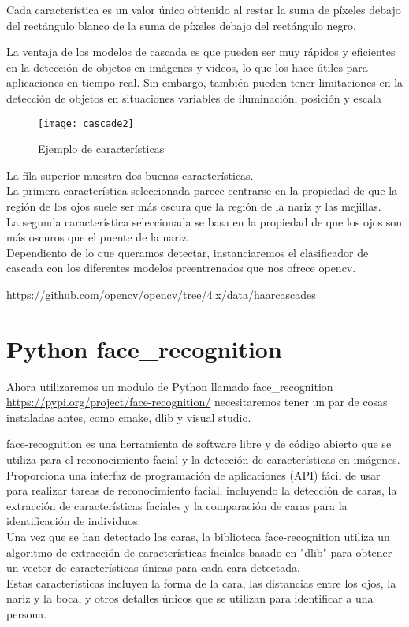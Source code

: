 Cada característica es un valor único obtenido al restar la suma de píxeles 
debajo del rectángulo blanco de la suma de píxeles debajo del rectángulo negro.

La ventaja de los modelos de cascada es que pueden ser muy rápidos y eficientes 
en la detección de objetos en imágenes y videos, lo que los hace útiles para 
aplicaciones en tiempo real. Sin embargo, también pueden tener limitaciones en 
la detección de objetos en situaciones variables de iluminación, posición y escala



\begin{figure}[H]
  \centering
  \texttt{[image: cascade2]}
  \caption{Ejemplo de características}\label{fig:ejemplo_característica}
\end{figure}

La fila superior muestra dos buenas características.\\
La primera característica seleccionada parece centrarse en la propiedad de 
que la región de los ojos suele ser más oscura que la región de la nariz y las mejillas.\\ 
La segunda característica seleccionada se basa en la propiedad de que los ojos son más 
oscuros que el puente de la nariz.\\


Dependiento de lo que queramos detectar, instanciaremos el clasificador de 
cascada con los diferentes modelos preentrenados que nos ofrece opencv.

\url{https://github.com/opencv/opencv/tree/4.x/data/haarcascades}

\section{Python face\_recognition}

Ahora utilizaremos un modulo de Python llamado face\_recognition
\url{https://pypi.org/project/face-recognition/}
necesitaremos tener un par de cosas instaladas antes, como cmake, dlib y visual studio.

face-recognition es una herramienta de software libre y de código abierto
que se utiliza para el reconocimiento facial y la detección de características en imágenes.\\

Proporciona una interfaz de programación de aplicaciones (API) fácil de usar
para realizar tareas de reconocimiento facial, incluyendo la detección de caras,
la extracción de características faciales y la comparación de caras para
la identificación de individuos.\\

Una vez que se han detectado las caras, la biblioteca face-recognition
utiliza un algoritmo de extracción de características faciales basado en 
"dlib" para obtener un vector de características únicas para cada cara detectada.\\
Estas características incluyen la forma de la cara, las distancias entre los ojos,
la nariz y la boca, y otros detalles únicos que se utilizan para identificar a una persona.

